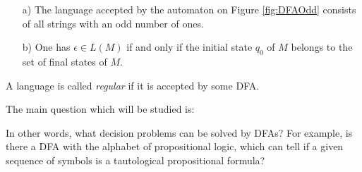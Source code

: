 \begin{page}
\setcounter{section}{1}
\setcounter{subsection}{2}
\setcounter{dfn}{3}
\label{portion:1021}

\begin{exl}
\par\noindent
\begin{enumerate}
\item[a)]
The language accepted by the automaton on Figure \ref{fig:DFAOdd} consists of all strings with an odd number of ones.
\item[b)]
One has $\epsilon \in L(M)$ if and only if the initial state $q_0$ of $M$ belongs to the set of final states of $M$.
\end{enumerate}
\end{exl}

\end{page}

\begin{page}
\setcounter{section}{1}
\setcounter{subsection}{2}
\setcounter{dfn}{4}
\label{portion:1024}

\begin{dfn}
A language is called \emph{regular} if it is accepted by some DFA.
\end{dfn}

\end{page}

\begin{page}
\setcounter{section}{1}
\setcounter{subsection}{2}
\setcounter{dfn}{4}
\label{portion:1025}


The main question which will be studied is:
\begin{center}
\end{center}

In other words, what decision problems can be solved by DFAs?
For example, is there a DFA with the alphabet of propositional logic, which can tell if a given sequence of symbols is a tautological propositional formula?


\end{page}

